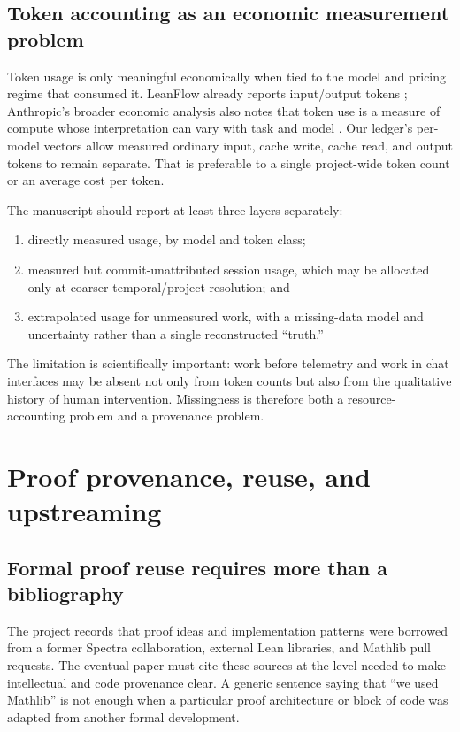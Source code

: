 \documentclass[11pt]{article}
\begin{document}
\subsection{Token accounting as an economic measurement problem}

Token usage is only meaningful economically when tied to the model and pricing
regime that consumed it.  LeanFlow already reports input/output tokens
\citep{milikic2026leanflow}; Anthropic's broader economic analysis also notes
that token use is a measure of compute whose interpretation can vary with task
and model \citep{anthropic2026expertise}.  Our ledger's per-model vectors allow
measured ordinary input, cache write, cache read, and output tokens to remain
separate.  That is preferable to a single project-wide token count or an average
cost per token.

The manuscript should report at least three layers separately:

\begin{enumerate}
  \item directly measured usage, by model and token class;
  \item measured but commit-unattributed session usage, which may be allocated
        only at coarser temporal/project resolution; and
  \item extrapolated usage for unmeasured work, with a missing-data model and
        uncertainty rather than a single reconstructed ``truth.''
\end{enumerate}

The limitation is scientifically important: work before telemetry and work in
chat interfaces may be absent not only from token counts but also from the
qualitative history of human intervention.  Missingness is therefore both a
resource-accounting problem and a provenance problem.

\section{Proof provenance, reuse, and upstreaming}
\label{sec:provenance}

\subsection{Formal proof reuse requires more than a bibliography}

The project records that proof ideas and implementation patterns were borrowed
from a former Spectra collaboration, external Lean libraries, and Mathlib pull
requests.  The eventual paper must cite these sources at the level needed to
make intellectual and code provenance clear.  A generic sentence saying that
``we used Mathlib'' is not enough when a particular proof architecture or block
of code was adapted from another formal development.
\end{document}
